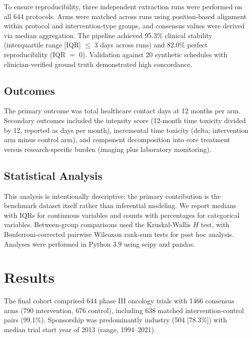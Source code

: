 \documentclass[12pt]{article}
\begin{document}
To ensure reproducibility, three independent extraction runs were performed on all 644 protocols. Arms were matched across runs using position-based alignment within protocol and intervention-type groups, and consensus values were derived via median aggregation. The pipeline achieved 95.3\% clinical stability (interquartile range [IQR] $\leq$ 3 days across runs) and 82.0\% perfect reproducibility (IQR $=$ 0). Validation against 20 synthetic schedules with clinician-verified ground truth demonstrated high concordance.\cite{companion}

\subsection*{Outcomes}

The primary outcome was total healthcare contact days at 12 months per arm. Secondary outcomes included the intensity score (12-month time toxicity divided by 12, reported as days per month), incremental time toxicity (delta; intervention arm minus control arm), and component decomposition into core treatment versus research-specific burden (imaging plus laboratory monitoring).

\subsection*{Statistical Analysis}

This analysis is intentionally descriptive: the primary contribution is the benchmark dataset itself rather than inferential modeling.\cite{strobe} We report medians with IQRs for continuous variables and counts with percentages for categorical variables. Between-group comparisons used the Kruskal-Wallis $H$ test, with Bonferroni-corrected pairwise Wilcoxon rank-sum tests for post hoc analysis. Analyses were performed in Python 3.9 using scipy and pandas.

\section*{Results}

The final cohort comprised 644 phase III oncology trials with 1466 consensus arms (790 intervention, 676 control), including 638 matched intervention-control pairs (99.1\%). Sponsorship was predominantly industry (504 [78.3\%]) with median trial start year of 2013 (range, 1994--2021).
\end{document}
